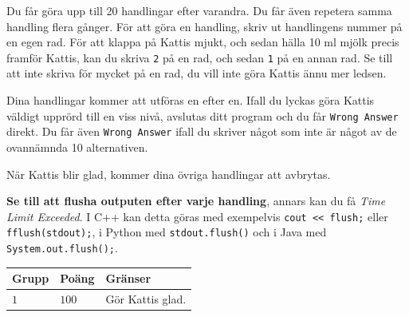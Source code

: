 Du får göra upp till 20 handlingar efter varandra. Du får även repetera samma handling flera gånger.
För att göra en handling, skriv ut handlingens nummer på en egen rad. För att klappa på Kattis mjukt, 
och sedan hälla 10 ml mjölk precis framför Kattis, kan du skriva \texttt{2} på en rad, och sedan \texttt{1} på en annan rad.
Se till att inte skriva för mycket på en rad, du vill inte göra Kattis ännu mer ledsen. 

Dina handlingar kommer att utföras en efter en. Ifall du lyckas göra Kattis väldigt upprörd till en viss nivå, 
avslutas ditt program och du får \texttt{Wrong Answer} direkt. 
Du får även \texttt{Wrong Answer} ifall du skriver något som inte är något av de ovannämnda 10 alternativen.

När Kattis blir glad, kommer dina övriga handlingar att avbrytas.

\textbf{Se till att flusha outputen efter varje handling}, annars kan du få \textit{Time Limit Exceeded}.
I C++ kan detta göras med exempelvis \texttt{cout << flush;}
eller \texttt{fflush(stdout);},
i Python med \texttt{stdout.flush()}
och i Java med \texttt{System.out.flush();}.


\noindent
\begin{tabular}{| l | l | l |}
  \hline
  \textbf{Grupp} & \textbf{Poäng} & \textbf{Gränser} \\ \hline
  $1$   & $100$        & Gör Kattis glad. \\ \hline
\end{tabular}
